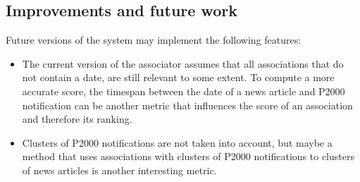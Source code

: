 \subsection{Improvements and future work}
Future versions of the system may implement the following features:
\begin{itemize}
\item The current version of the associator assumes that all associations that do not contain a date, are still relevant to some extent. To compute a more accurate score, the timespan between the date of a news article and P2000 notification can be another metric that influences the score of an association and therefore its ranking.
\item Clusters of P2000 notifications are not taken into account, but maybe a method that uses associations with clusters of P2000 notifications to clusters of news articles is another interesting metric.
\end{itemize}
